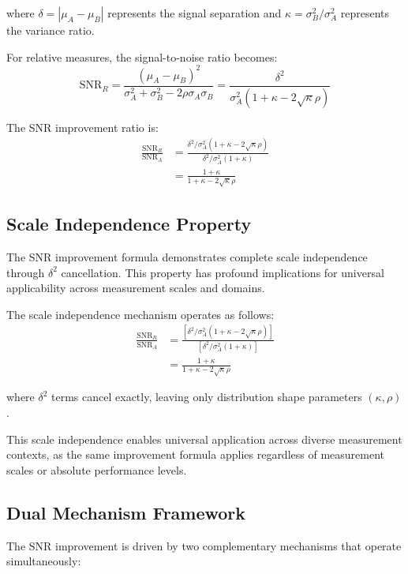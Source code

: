 where $\delta = |\mu_A - \mu_B|$ represents the signal separation and $\kappa = \sigma_B^2/\sigma_A^2$ represents the variance ratio.

For relative measures, the signal-to-noise ratio becomes:
\begin{equation}
\text{SNR}_R = \frac{(\mu_A - \mu_B)^2}{\sigma_A^2 + \sigma_B^2 - 2\rho\sigma_A\sigma_B} = \frac{\delta^2}{\sigma_A^2(1 + \kappa - 2\sqrt{\kappa}\rho)} \label{eq:relative_snr}
\end{equation}

The SNR improvement ratio is:
\begin{align}
\frac{\text{SNR}_R}{\text{SNR}_A} &= \frac{\delta^2/\sigma_A^2(1 + \kappa - 2\sqrt{\kappa}\rho)}{\delta^2/\sigma_A^2(1 + \kappa)} \nonumber \\
&= \frac{1 + \kappa}{1 + \kappa - 2\sqrt{\kappa}\rho} \label{eq:snr_improvement}
\end{align}

\subsection{Scale Independence Property}

The SNR improvement formula demonstrates complete scale independence through $\delta^2$ cancellation. This property has profound implications for universal applicability across measurement scales and domains.

The scale independence mechanism operates as follows:
\begin{align}
\frac{\text{SNR}_R}{\text{SNR}_A} &= \frac{[\delta^2/\sigma_A^2(1 + \kappa - 2\sqrt{\kappa}\rho)]}{[\delta^2/\sigma_A^2(1 + \kappa)]} \nonumber \\
&= \frac{1 + \kappa}{1 + \kappa - 2\sqrt{\kappa}\rho} \label{eq:scale_independence}
\end{align}

where $\delta^2$ terms cancel exactly, leaving only distribution shape parameters $(\kappa, \rho)$.

This scale independence enables universal application across diverse measurement contexts, as the same improvement formula applies regardless of measurement scales or absolute performance levels.

\subsection{Dual Mechanism Framework}

The SNR improvement is driven by two complementary mechanisms that operate simultaneously:

